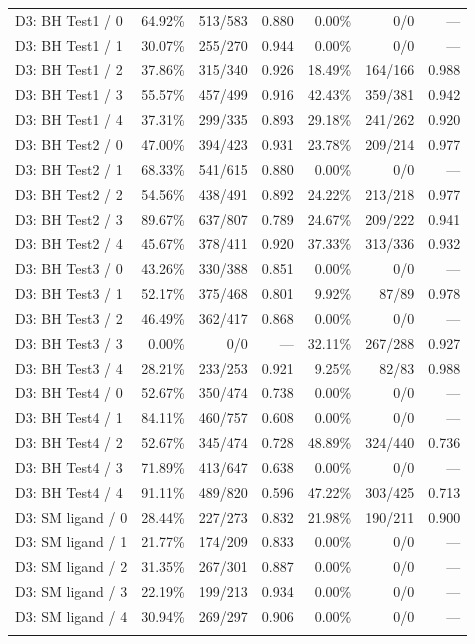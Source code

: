 \begin{longtable}{@{}lrrrrrr@{}}
\addlinespace
D3: BH Test1 / 0 & 64.92\% & 513/583 & 0.880 & 0.00\% & 0/0 & --- \\
D3: BH Test1 / 1 & 30.07\% & 255/270 & 0.944 & 0.00\% & 0/0 & --- \\
D3: BH Test1 / 2 & 37.86\% & 315/340 & 0.926 & 18.49\% & 164/166 & 0.988 \\
D3: BH Test1 / 3 & 55.57\% & 457/499 & 0.916 & 42.43\% & 359/381 & 0.942 \\
D3: BH Test1 / 4 & 37.31\% & 299/335 & 0.893 & 29.18\% & 241/262 & 0.920 \\
\addlinespace
D3: BH Test2 / 0 & 47.00\% & 394/423 & 0.931 & 23.78\% & 209/214 & 0.977 \\
D3: BH Test2 / 1 & 68.33\% & 541/615 & 0.880 & 0.00\% & 0/0 & --- \\
D3: BH Test2 / 2 & 54.56\% & 438/491 & 0.892 & 24.22\% & 213/218 & 0.977 \\
D3: BH Test2 / 3 & 89.67\% & 637/807 & 0.789 & 24.67\% & 209/222 & 0.941 \\
D3: BH Test2 / 4 & 45.67\% & 378/411 & 0.920 & 37.33\% & 313/336 & 0.932 \\
\addlinespace
D3: BH Test3 / 0 & 43.26\% & 330/388 & 0.851 & 0.00\% & 0/0 & --- \\
D3: BH Test3 / 1 & 52.17\% & 375/468 & 0.801 & 9.92\% & 87/89 & 0.978 \\
D3: BH Test3 / 2 & 46.49\% & 362/417 & 0.868 & 0.00\% & 0/0 & --- \\
D3: BH Test3 / 3 & 0.00\% & 0/0 & --- & 32.11\% & 267/288 & 0.927 \\
D3: BH Test3 / 4 & 28.21\% & 233/253 & 0.921 & 9.25\% & 82/83 & 0.988 \\
\addlinespace
D3: BH Test4 / 0 & 52.67\% & 350/474 & 0.738 & 0.00\% & 0/0 & --- \\
D3: BH Test4 / 1 & 84.11\% & 460/757 & 0.608 & 0.00\% & 0/0 & --- \\
D3: BH Test4 / 2 & 52.67\% & 345/474 & 0.728 & 48.89\% & 324/440 & 0.736 \\
D3: BH Test4 / 3 & 71.89\% & 413/647 & 0.638 & 0.00\% & 0/0 & --- \\
D3: BH Test4 / 4 & 91.11\% & 489/820 & 0.596 & 47.22\% & 303/425 & 0.713 \\
\addlinespace
D3: SM ligand / 0 & 28.44\% & 227/273 & 0.832 & 21.98\% & 190/211 & 0.900 \\
D3: SM ligand / 1 & 21.77\% & 174/209 & 0.833 & 0.00\% & 0/0 & --- \\
D3: SM ligand / 2 & 31.35\% & 267/301 & 0.887 & 0.00\% & 0/0 & --- \\
D3: SM ligand / 3 & 22.19\% & 199/213 & 0.934 & 0.00\% & 0/0 & --- \\
D3: SM ligand / 4 & 30.94\% & 269/297 & 0.906 & 0.00\% & 0/0 & --- \\
\addlinespace
\end{longtable}